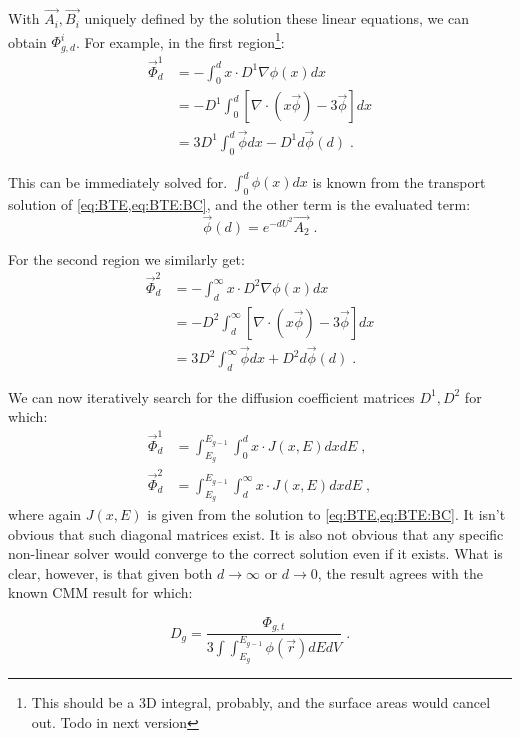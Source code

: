 \documentclass[a4paper,letterpaper,12pt,oneside,draft]{article}
\newcommand{\eec}{\;,}
\newcommand{\eep}{\;.}
\newcommand{\intg}[2][g]{\ensuremath{\int_{E_{#1}}^{E_{#1-1}} #2 dE}}
\newcommand{\vr}{\ensuremath{\vec{r}}}
\begin{document}
    With $\vec{A_i},\vec{B_i}$ uniquely defined by the solution these linear equations, we can obtain $\Phi_{g,d}^i$. For example, in the first region\footnote{This should be a 3D integral, probably, and the surface areas would cancel out. Todo in next version}:
    \begin{align}
    \label{eq:Res:1}
        \vec{\Phi}_{d}^1 &= -\int_{0}^{d}x\cdot D^1\nabla \phi(x)dx \\\nonumber
        &= -D^1\int_{0}^{d}\left[\nabla\cdot (x\vec{\phi}) - 3\vec{\phi}\right]dx \\\nonumber
        &= 3D^1\int_{0}^{d}\vec{\phi}dx - D^1d\vec{\phi}(d) \eep
    \end{align}
    
    This can be immediately solved for. $\int_0^d\phi(x)dx$ is known from the transport solution of \cref{eq:BTE,eq:BTE:BC}, and the other term is the evaluated term:
    \begin{equation}
    \label{eq:interface:intro}
        \vec{\phi}(d) = e^{-dU^2}\vec{A_2}\eep
    \end{equation}
    
    For the second region we similarly get:
    \begin{align}
     \label{eq:Res:2}
         \vec{\Phi}_{d}^2 &= -\int_{d}^{\infty}x\cdot D^2\nabla \phi(x)dx \\\nonumber
         &= -D^2\int_{d}^{\infty}\left[\nabla\cdot (x\vec{\phi}) - 3\vec{\phi}\right]dx \\\nonumber
         &= 3D^2\int_{d}^{\infty}\vec{\phi}dx + D^2d\vec{\phi}(d) \eep
    \end{align}
    
    We can now iteratively search for the diffusion coefficient matrices $D^1,D^2$ for which: 
    \begin{align*}
    \vec{\Phi}_d^1 &= \intg{\int_0^d x\cdot J(x,E)dx} \eec \\
    \vec{\Phi}_d^2 &= \intg{\int_d^\infty x\cdot J(x,E)dx} \eec
    \end{align*}
    where again $J(x,E)$ is given from the solution to \cref{eq:BTE,eq:BTE:BC}.
    It isn't obvious that such diagonal matrices exist. It is also not obvious that any specific non-linear solver would converge to the correct solution even if it exists. What is clear, however, is that given both $d\to\infty$ or $d\to 0$, the result agrees with the known CMM result for which:
    
    \begin{equation}
    D_g = \frac{\Phi_{g,t}}{3\int\intg{\phi(\vr)}dV}\eep
    \end{equation}
    
\end{document}
